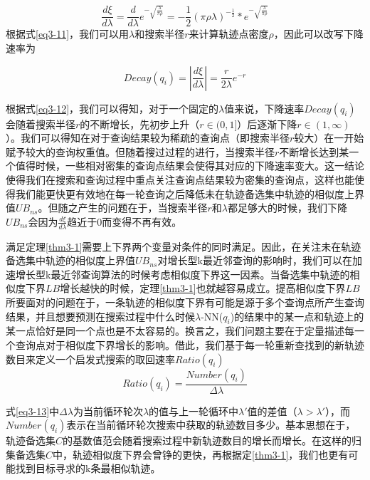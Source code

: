\begin{equation}
\label{eq3-11}
\frac{d\xi}{d\lambda} = \frac{d}{d\lambda}e^{-\sqrt{\frac{\lambda}{\pi\rho}}} = -\frac{1}{2}(\pi\rho\lambda)^{-\frac{1}{2}}*e^{-\sqrt{\frac{\lambda}{\pi\rho}}}
\end{equation}
根据式\ref{eq3-11}，我们可以用$\lambda$和搜索半径$r$来计算轨迹点密度$\rho$，因此可以改写下降速率为

\begin{equation}
\label{eq3-12}
Decay(q_i) = |\frac{d\xi}{d\lambda}| = \frac{r}{2\lambda}e^{-r} 
\end{equation}

根据式\ref{eq3-12}，我们可以得知，对于一个固定的$\lambda$值来说，下降速率$Decay(q_i)$会随着搜索半径$r$的不断增长，先初步上升（$r\in(0,1]$）后逐渐下降$r\in(1,\infty)$）。我们可以得知在对于查询结果较为稀疏的查询点（即搜索半径$r$较大）在一开始赋予较大的查询权重值。但随着搜过过程的进行，当搜索半径$r$不断增长达到某一个值得时候，一些相对密集的查询点结果会使得其对应的下降速率变大。这一结论使得我们在搜索和查询过程中重点关注查询点结果较为密集的查询点，这样也能使得我们能更快更有效地在每一轮查询之后降低未在轨迹备选集中轨迹的相似度上界值$UB_{ns}$。但随之产生的问题在于，当搜索半径$r$和$\lambda$都足够大的时候，我们下降$UB_{ns}$会因为$\frac{d\xi}{d\lambda}$趋近于0而变得不再有效。

满足定理\ref{thm3-1}需要上下界两个变量对条件的同时满足。因此，在关注未在轨迹备选集中轨迹的相似度上界值$UB_{ns}$对增长型k最近邻查询的影响时，我们可以在加速增长型k最近邻查询算法的时候考虑相似度下界这一因素。当备选集中轨迹的相似度下界$LB$增长越快的时候，定理\ref{thm3-1}也就越容易成立。提高相似度下界$LB$所要面对的问题在于，一条轨迹的相似度下界有可能是源于多个查询点所产生查询结果，并且想要预测在搜索过程中什么时候$\lambda$-NN($q_i$)的结果中的某一点和轨迹上的某一点恰好是同一个点也是不太容易的。换言之，我们问题主要在于定量描述每一个查询点对于相似度下界增长的影响。借此，我们基于每一轮重新查找到的新轨迹数目来定义一个启发式搜索的取回速率$Ratio(q_i)$
\begin{equation}
\label{eq3-13}
Ratio(q_i) = \frac{Number(q_i)}{\Delta\lambda}
\end{equation}

式\ref{eq3-13}中$\Delta\lambda$为当前循环轮次$\lambda$的值与上一轮循环中$\lambda'$值的差值（$\lambda > \lambda'$），而$Number(q_i)$表示在当前循环轮次搜索中获取的轨迹数目多少。基本思想在于，轨迹备选集$C$的基数值范会随着搜索过程中新轨迹数目的增长而增长。在这样的归集备选集$C$中，轨迹相似度下界会曾铮的更快，再根据定\ref{thm3-1}，我们也更有可能找到目标寻求的k条最相似轨迹。

